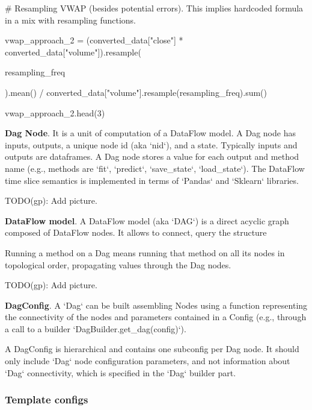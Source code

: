 \documentclass[11pt, reqno]{amsart}
\begin{document}
\# Resampling VWAP (besides potential errors). This implies hardcoded
formula in a mix with resampling functions.

vwap\_approach\_2 = (converted\_data{[}"close"{]} *
converted\_data{[}"volume"{]}).resample(

resampling\_freq

).mean() /
converted\_data{[}"volume"{]}.resample(resampling\_freq).sum()

vwap\_approach\_2.head(3)

\textbf{Dag Node}. It is a unit of computation of a DataFlow model. A
Dag node has inputs, outputs, a unique node id (aka `nid`), and a state.
Typically inputs and outputs are dataframes. A Dag node stores a value
for each output and method name (e.g., methods are `fit`, `predict`,
`save\_state`, `load\_state`). The DataFlow time slice semantics is
implemented in terms of `Pandas` and `Sklearn` libraries.

TODO(gp): Add picture.

\textbf{DataFlow model}. A DataFlow model (aka `DAG`) is a direct
acyclic graph composed of DataFlow nodes. It allows to connect, query
the structure

Running a method on a Dag means running that method on all its nodes in
topological order, propagating values through the Dag nodes.

TODO(gp): Add picture.

\textbf{DagConfig}. A `Dag` can be built assembling Nodes using a
function representing the connectivity of the nodes and parameters
contained in a Config (e.g., through a call to a builder
`DagBuilder.get\_dag(config)`).

A DagConfig is hierarchical and contains one subconfig per Dag node. It
should only include `Dag` node configuration parameters, and not
information about `Dag` connectivity, which is specified in the `Dag`
builder part.

\hypertarget{template-configs}{%
\subsubsection{\texorpdfstring{\textbf{Template
configs}}{Template configs}}\label{template-configs}}
\end{document}
